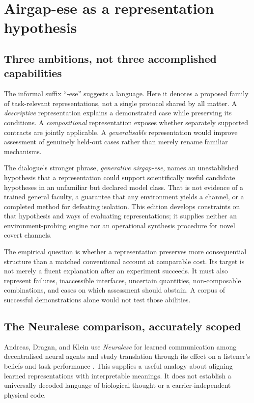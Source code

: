 \section{Airgap-ese as a representation hypothesis}\label{sec:representation}
\subsection{Three ambitions, not three accomplished capabilities}
The informal suffix ``-ese'' suggests a language. Here it denotes a proposed family of task-relevant representations, not a single protocol shared by all matter. A \emph{descriptive} representation explains a demonstrated case while preserving its conditions. A \emph{compositional} representation exposes whether separately supported contracts are jointly applicable. A \emph{generalisable} representation would improve assessment of genuinely held-out cases rather than merely rename familiar mechanisms.

The dialogue's stronger phrase, \emph{generative airgap-ese}, names an unestablished hypothesis that a representation could support scientifically useful candidate hypotheses in an unfamiliar but declared model class. That is not evidence of a trained general faculty, a guarantee that any environment yields a channel, or a completed method for defeating isolation. This edition develops constraints on that hypothesis and ways of evaluating representations; it supplies neither an environment-probing engine nor an operational synthesis procedure for novel covert channels.

The empirical question is whether a representation preserves more consequential structure than a matched conventional account at comparable cost. Its target is not merely a fluent explanation after an experiment succeeds. It must also represent failures, inaccessible interfaces, uncertain quantities, non-composable combinations, and cases on which assessment should abstain. A corpus of successful demonstrations alone would not test those abilities.

\subsection{The Neuralese comparison, accurately scoped}
Andreas, Dragan, and Klein use \emph{Neuralese} for learned communication among decentralised neural agents and study translation through its effect on a listener's beliefs and task performance \citep{neuralese}. This supplies a useful analogy about aligning learned representations with interpretable meanings. It does not establish a universally decoded language of biological thought or a carrier-independent physical code.


